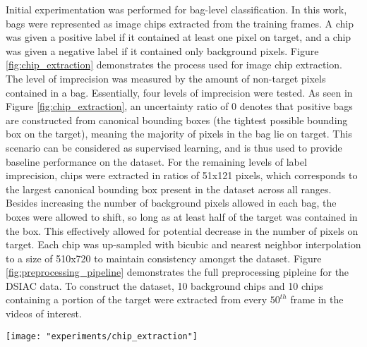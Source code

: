 Initial experimentation was performed for bag-level classification.  In this work, bags were represented as image chips extracted from the training frames.  A chip was given a positive label if it contained at least one pixel on target, and a chip was given a negative label if it contained only background pixels.   Figure \ref{fig:chip_extraction} demonstrates the process used for image chip extraction.  The level of imprecision was measured by the amount of non-target pixels contained in a bag.  Essentially, four levels of imprecision were tested.  As seen in Figure \ref{fig:chip_extraction}, an uncertainty ratio of 0 denotes that positive bags are constructed from canonical bounding boxes (the tightest possible bounding box on the target), meaning the majority of pixels in the bag lie on target.  This scenario can be considered as supervised learning, and is thus used to provide baseline performance on the dataset. For the remaining levels of label imprecision, chips were extracted in ratios of 51x121 pixels, which corresponds to the largest canonical bounding box present in the dataset across all ranges.  Besides increasing the number of background pixels allowed in each bag, the boxes were  allowed to shift, so long as at least half of the target was contained in the box.  This effectively allowed for potential decrease in the number of pixels on target.  Each chip was up-sampled with bicubic and nearest neighbor interpolation to a size of  510x720 to maintain consistency amongst the dataset. Figure \ref{fig:preprocessing_pipeline} demonstrates the full preprocessing pipleine for the DSIAC data. To construct the dataset, 10 background chips and 10 chips containing a portion of the target were extracted from every $50^{th}$ frame in the videos of interest.
\begin{center}
	\begin{figure*}[h!]
		\centering
		\texttt{[image: "experiments/chip\_extraction"]}
		\caption[Image chip extraction]{Example image chips for varying ratios of bag imprecision.  The top row shows the regions of the original frame included in the image chips.  Chips sizes are scalars of 51x121.  The bottom row shows the corresponding image chips.  Red denotes the area of the canonical bounding box while blue is labeled as the background class.  As can be seen, the number of non-target pixels in the chips increases as the chip area increases.  Each of the chips are considered as positive bags since they contain at least one pixel on target.}
		\label{fig:chip_extraction}
	\end{figure*}
\end{center}

